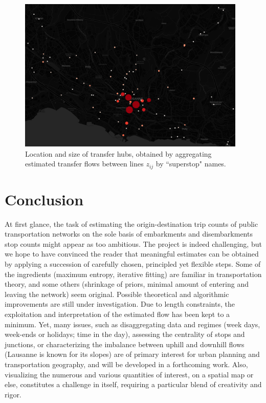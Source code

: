 \documentclass{bmcart}
\begin{document}
\begin{figure}[h]
	\includegraphics[width=0.97\textwidth]{fig/transfers.png}
	\caption{Location and size of transfer hubs, obtained by aggregating estimated transfer flows between lines $z_{ij}$ by ``superstop" names.}
	\label{transfers}
\end{figure}


\section{Conclusion}
\label{conclusion}
At first glance, the task of estimating the origin-destination trip counts of public transportation networks on the sole basis of embarkments and disembarkments stop counts might appear as too ambitious. The project is indeed challenging, but we hope to have convinced the reader that meaningful estimates can be obtained by applying a succession of carefully chosen, principled yet flexible steps. Some of the ingredients (maximum entropy, iterative fitting) are familiar in transportation theory, and some others (shrinkage of priors, minimal amount of entering and leaving the network) seem original. Possible theoretical and algorithmic improvements are still under investigation.
Due to length constraints, the exploitation and interpretation of the estimated flow has been kept to a minimum. Yet, many issues, such as disaggregating data and regimes (week days, week-ends or holidays; time in the day), assessing the centrality of stops and junctions, or characterizing the imbalance between uphill and downhill flows (Lausanne is known for its slopes) are of primary interest for urban planning and transportation geography, and will be developed in a forthcoming work. Also, visualizing the numerous and various quantities of interest, on a spatial map or else, constitutes a challenge in itself, requiring a particular blend of creativity and rigor.
\end{document}
